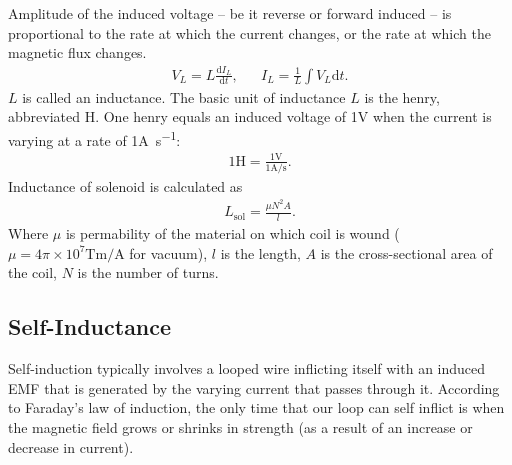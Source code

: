 \documentclass[../../document]{subfiles}
\begin{document}
Amplitude of the induced voltage -- be it reverse or forward induced -- is
proportional to the rate at which the current changes, or the rate at which the
magnetic flux changes.
\begin{align}
	V_L = L\frac{\mathrm d I_L}{\mathrm dt}, && I_L = \frac{1}{L}\int V_L\mathrm d t.
\end{align}
\(L\) is called an inductance. The basic unit of inductance \(L\) is the henry,
abbreviated \unit{\henry}. One henry equals an induced voltage of 1\unit{\volt}
when the current is varying at a rate of 1\unit{\ampere\per\second}:
\cite{practical_electronics}
\begin{gather}
	1\unit{\henry} = \frac{1\unit{\volt}}{1\unit{\ampere/\second}}. \tag{Definition of a henry}
\end{gather}
Inductance of solenoid is calculated as 
\begin{gather}
	L_{\text{sol}} = \frac{\mu N^2A}{l}.
\end{gather}
Where \(\mu\) is permability of the material on which coil is wound (\(\mu
=4\pi\times 10^{7}\unit{\tesla\meter\per\ampere}\) for vacuum), \(l\) is the
length, \(A\) is the cross-sectional area of the coil, \(N\) is the number of
turns. \cite{practical_electronics}



\subsection{Self-Inductance}
Self-induction typically involves a looped wire inflicting itself with an
induced EMF that is generated by the varying current that passes through it.
According to Faraday’s law of induction, the only time that our loop can self
­inflict is when the magnetic field grows or shrinks in strength (as a result
of an increase or decrease in current). \cite{practical_electronics}
\end{document}
